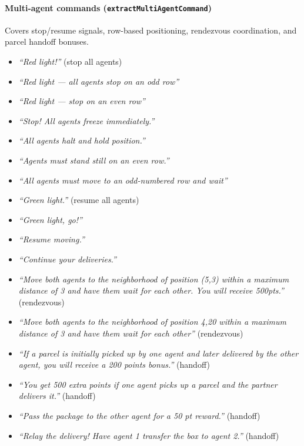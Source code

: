 \paragraph{Multi-agent commands (\texttt{extractMultiAgentCommand})}
Covers stop/resume signals, row-based positioning, rendezvous coordination, and parcel handoff bonuses.
\begin{itemize}
  \item \textit{``Red light!''} \quad (stop all agents)
  \item \textit{``Red light --- all agents stop on an odd row''}
  \item \textit{``Red light --- stop on an even row''}
  \item \textit{``Stop! All agents freeze immediately.''}
  \item \textit{``All agents halt and hold position.''}
  \item \textit{``Agents must stand still on an even row.''}
  \item \textit{``All agents must move to an odd-numbered row and wait''}
  \item \textit{``Green light.''} \quad (resume all agents)
  \item \textit{``Green light, go!''}
  \item \textit{``Resume moving.''}
  \item \textit{``Continue your deliveries.''}
  \item \textit{``Move both agents to the neighborhood of position (5,3) within a maximum distance of 3 and have them wait for each other. You will receive 500pts.''} \quad (rendezvous)
  \item \textit{``Move both agents to the neighborhood of position 4,20 within a maximum distance of 3 and have them wait for each other''} \quad (rendezvous)
  \item \textit{``If a parcel is initially picked up by one agent and later delivered by the other agent, you will receive a 200 points bonus.''} \quad (handoff)
  \item \textit{``You get 500 extra points if one agent picks up a parcel and the partner delivers it.''} \quad (handoff)
  \item \textit{``Pass the package to the other agent for a 50 pt reward.''} \quad (handoff)
  \item \textit{``Relay the delivery! Have agent 1 transfer the box to agent 2.''} \quad (handoff)
\end{itemize}
